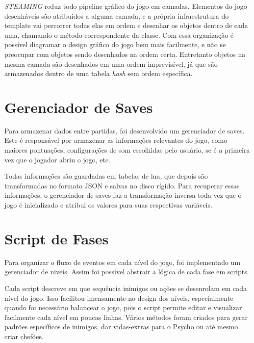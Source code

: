 \textit{STEAMING} reduz todo pipeline gráfico do jogo em camadas. Elementos do jogo desenháveis são atribuidos a alguma camada, e a própria infraestrutura do template vai percorrer todas elas  em ordem e desenhar os objetos dentro de cada uma, chamando o método correspondente da classe. Com essa organização é possível diagramar o design gráfico do jogo bem mais facilmente, e não se preocupar com objetos sendo desenhados na ordem certa. Entretanto objetos na mesma camada são desenhados em uma ordem imprevisível, já que são armazenados dentro de uma tabela \textit{hash} sem ordem específica.

\section{Gerenciador de Saves}
\label{sec:gerenciador_de_saves}

Para armazenar dados entre partidas, foi desenvolvido um gerenciador de saves. Este é responsável por armazenar as informações relevantes do jogo, como maiores pontuações, configurações de som escolhidas pelo usuário, se é a primeira vez que o jogador abriu o jogo, etc.

Todas informações são guardadas em tabelas de lua, que depois são transformadas no formato JSON e salvas no disco rígido. Para recuperar essas informações, o gerenciador de saves faz a transformação inversa toda vez que o jogo é inicializado e atribui os valores para suas respectivas variáveis.

\section{Script de Fases}
\label{sec:level_script}

Para organizar o fluxo de eventos em cada nível do jogo, foi implementado um gerenciador de niveis. Assim foi possível abstrair a lógica de cada fase em scripts.

Cada script descreve em que sequência inimigos ou ações se desenrolam em cada nível do jogo. Isso facilitou imensamente no design dos níveis, especialmente quando foi necessário balancear o jogo, pois o script permite editar e visualizar facilmente cada nível em poucas linhas. Vários métodos foram criados para gerar padrões específicos de inimigos, dar vidas-extras para o Psycho ou até mesmo criar chefões.

